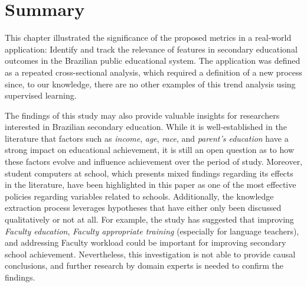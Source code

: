 \section{Summary}

This chapter illustrated the significance of the proposed metrics in a real-world application: Identify and track the relevance of features in secondary educational outcomes in the Brazilian public educational system. The application was defined as a repeated cross-sectional analysis, which required a definition of a new process since, to our knowledge,  there are no other examples of this trend analysis using supervised learning. 

The findings of this study may also provide valuable insights for researchers interested in Brazilian secondary education. While it is well-established in the literature that factors such as \textit{income}, \textit{age}, \textit{race}, and \textit{parent's education} have a strong impact on educational achievement, it is still an open question as to how these factors evolve and influence achievement over the period of study. Moreover, student computers at school, which presents mixed findings regarding its effects in the literature, have been highlighted in this paper as one of the most effective policies regarding variables related to schools. Additionally, the knowledge extraction process leverages hypotheses that have either only been discussed qualitatively or not at all. For example, the study has suggested that improving \textit{Faculty education}, \textit{Faculty appropriate training} (especially for language teachers), and addressing Faculty workload could be important for improving secondary school achievement. Nevertheless, this investigation is not able to provide  causal conclusions, and further research by domain experts is needed to confirm the findings. 